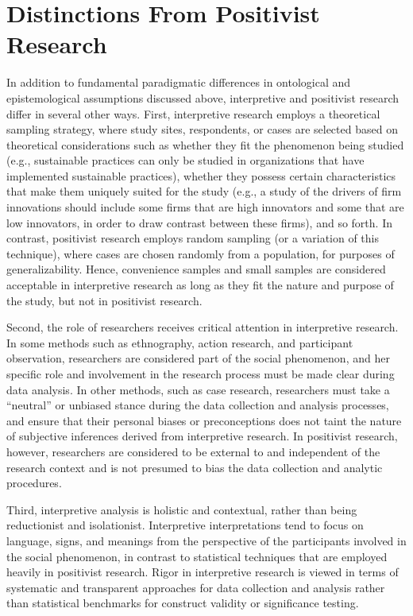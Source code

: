 \section{Distinctions From Positivist Research}

In addition to fundamental paradigmatic differences in ontological and epistemological assumptions discussed above, interpretive and positivist research differ in several other ways. First, interpretive research employs a theoretical sampling strategy, where study sites, respondents, or cases are selected based on theoretical considerations such as whether they fit the phenomenon being studied (e.g., sustainable practices can only be studied in organizations that have implemented sustainable practices), whether they possess certain characteristics that make them uniquely suited for the study (e.g., a study of the drivers of firm innovations should include some firms that are high innovators and some that are low innovators, in order to draw contrast between these firms), and so forth. In contrast, positivist research employs random sampling (or a variation of this technique), where cases are chosen randomly from a population, for purposes of generalizability. Hence, convenience samples and small samples are considered acceptable in interpretive research as long as they fit the nature and purpose of the study, but not in positivist research.

Second, the role of researchers receives critical attention in interpretive research. In some methods such as ethnography, action research, and participant observation, researchers are considered part of the social phenomenon, and her specific role and involvement in the research process must be made clear during data analysis. In other methods, such as case research, researchers must take a ``neutral'' or unbiased stance during the data collection and analysis processes, and ensure that their personal biases or preconceptions does not taint the nature of subjective inferences derived from interpretive research. In positivist research, however, researchers are considered to be external to and independent of the research context and is not presumed to bias the data collection and analytic procedures.

Third, interpretive analysis is holistic and contextual, rather than being reductionist and isolationist. Interpretive interpretations tend to focus on language, signs, and meanings from the perspective of the participants involved in the social phenomenon, in contrast to statistical techniques that are employed heavily in positivist research. Rigor in interpretive research is viewed in terms of systematic and transparent approaches for data collection and analysis rather than statistical benchmarks for construct validity or significance testing.

